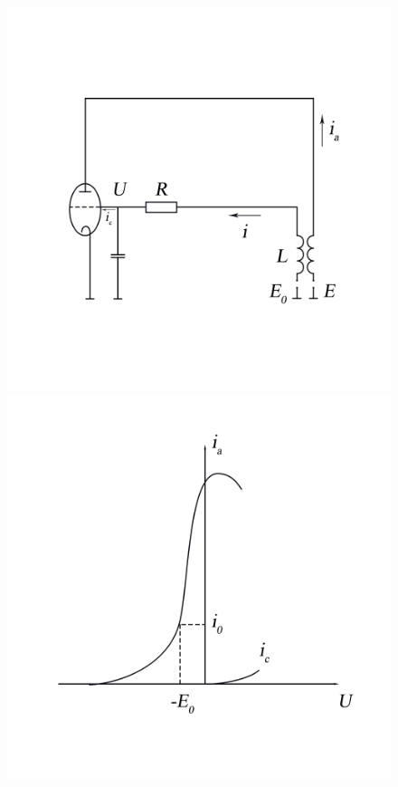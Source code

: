 \begin{figure}[h!]
	\centering
    \begin{minipage}{0.49\linewidth}
        \includegraphics[width=\linewidth]{photo/pics/Ris3.png}
        \vspace{-60pt}
        \caption{}
        \label{fig:3}
    \end{minipage}
\hfill     
    \begin{minipage}{0.49\linewidth}
        \centering
        \includegraphics[width=\linewidth]{photo/pics/Ris4.png}
        \vspace{-60pt}
        \caption{} 
        \label{fig:4}
    \end{minipage} 
\end{figure}   


